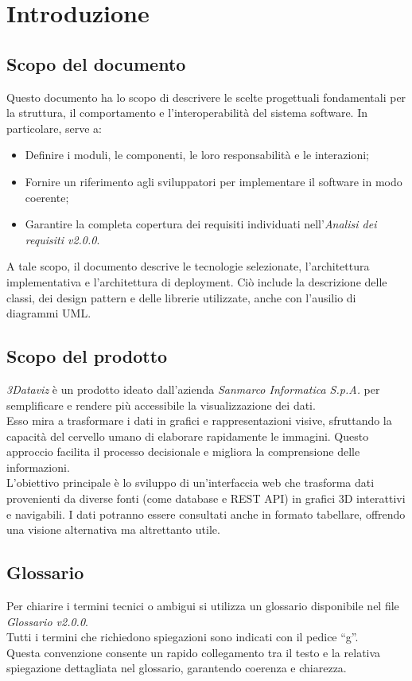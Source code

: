 \section{Introduzione}
\subsection{Scopo del documento}
Questo documento ha lo scopo di descrivere le scelte progettuali fondamentali
per la struttura, il comportamento e l'interoperabilità del sistema software.
In particolare, serve a:
\begin{itemize}
      \item Definire i moduli, le componenti, le loro responsabilità e le interazioni;
      \item Fornire un riferimento agli sviluppatori per implementare il software in modo
            coerente;
      \item Garantire la completa copertura dei requisiti individuati nell'\textit{Analisi
                  dei requisiti v2.0.0}.
\end{itemize}
A tale scopo, il documento descrive le tecnologie selezionate, l'architettura implementativa e l'architettura
di deployment. Ciò include la descrizione delle classi, dei design pattern e delle librerie utilizzate, anche
con l'ausilio di diagrammi UML.

\subsection{Scopo del prodotto}
\textit{3Dataviz} è un prodotto ideato dall'azienda \textit{Sanmarco Informatica S.p.A.} per semplificare e rendere più accessibile la visualizzazione dei dati.\\
Esso mira a trasformare i dati in grafici e rappresentazioni visive, sfruttando la capacità del cervello umano di elaborare rapidamente le immagini.
Questo approccio facilita il processo decisionale e migliora la comprensione delle informazioni.\\
L'obiettivo principale è lo sviluppo di un'interfaccia web che trasforma dati provenienti da diverse fonti (come database e REST API) in grafici 3D interattivi e navigabili.
I dati potranno essere consultati anche in formato tabellare, offrendo una visione alternativa ma altrettanto utile.

\subsection{Glossario}
Per chiarire i termini tecnici o ambigui si utilizza un glossario disponibile
nel file \textit{Glossario v2.0.0}.\\ Tutti i termini che richiedono
spiegazioni sono indicati con il pedice “g”. \\ Questa convenzione consente un
rapido collegamento tra il testo e la relativa spiegazione dettagliata nel
glossario, garantendo coerenza e chiarezza.

